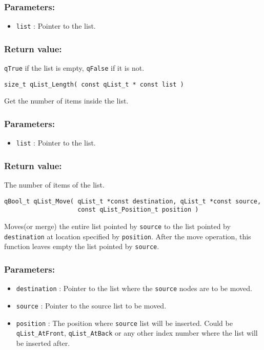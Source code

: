\subsubsection*{Parameters:}
\begin{itemize}
    \item \lstinline{list} : Pointer to the list. 
\end{itemize}

\subsubsection*{Return value:}
\lstinline{qTrue} if the list is empty, \lstinline{qFalse} if it is not.


\noindent\hrulefill

\begin{lstlisting}[style=CStyle]
size_t qList_Length( const qList_t * const list )
\end{lstlisting}

Get the number of items inside the list. 

\subsubsection*{Parameters:}
\begin{itemize}
    \item \lstinline{list} : Pointer to the list. 
\end{itemize}

\subsubsection*{Return value:}
The number of items of the list. 

\noindent\hrulefill

\begin{lstlisting}[style=CStyle]
qBool_t qList_Move( qList_t *const destination, qList_t *const source, 
                    const qList_Position_t position )
\end{lstlisting} 

Moves(or merge) the entire list pointed by \lstinline{source} to the list pointed by \lstinline{destination} at location specified by \lstinline{position}. 
After the move operation, this function leaves empty the list pointed by \lstinline{source}.

\subsubsection*{Parameters:}
\begin{itemize}
    \item \lstinline{destination} : Pointer to the list where the \lstinline{source} nodes are to be moved. 
    \item \lstinline{source} : Pointer to the source list to be moved.
    \item \lstinline{position} : The position where \lstinline{source} list will be inserted. Could be \lstinline{qList_AtFront}, \lstinline{qList_AtBack} or any other index number where the list will be inserted after.
\end{itemize}

